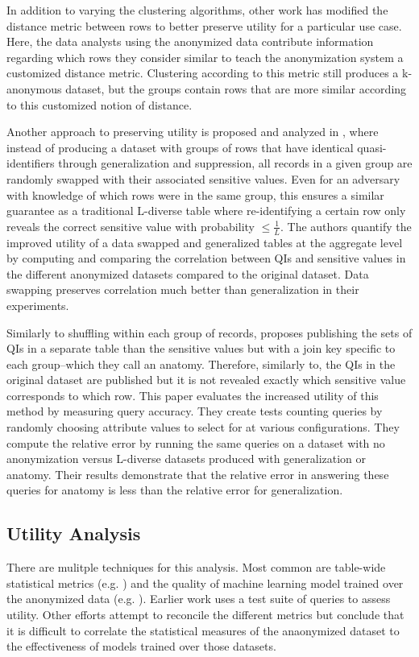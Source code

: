 In addition to varying the clustering algorithms, other work has modified the distance metric between rows to better preserve utility for a particular use case\cite{jiaPad}. Here, the data analysts using the anonymized data contribute information regarding which rows they consider similar to teach the anonymization system a customized distance metric. Clustering according to this metric still produces a k-anonymous dataset, but the groups contain rows that are more similar according to this customized notion of distance.

Another approach to preserving utility is proposed and analyzed in \cite{soriaSwapping}, where instead of producing a dataset with groups of rows that have identical quasi-identifiers through generalization and suppression, all records in a given group are randomly swapped with their associated sensitive values. Even for an adversary with knowledge of which rows were in the same group, this ensures a similar guarantee as a traditional L-diverse table where re-identifying a certain row only reveals the correct sensitive value with probability $\leq\frac{1}{L}$. The authors quantify the improved utility of a data swapped and generalized tables at the aggregate level by computing and comparing the correlation between QIs and sensitive values in the different anonymized datasets compared to the original dataset. Data swapping preserves correlation much better than generalization in their experiments.

Similarly to shuffling within each group of records, \cite{xiaoAnatomy} proposes publishing the sets of QIs in a separate table than the sensitive values but with a join key specific to each group--which they call an anatomy. Therefore, similarly to\cite{soriaSwapping}, the QIs in the original dataset are published but it is not revealed exactly which sensitive value corresponds to which row. This paper evaluates the increased utility of this method by measuring query accuracy. They create tests counting queries by randomly choosing attribute values to select for at various configurations. They compute the relative error by running the same queries on a dataset with no anonymization versus L-diverse datasets produced with generalization or anatomy. Their results demonstrate that the relative error in answering these queries for anatomy is less than the relative error for generalization.

\subsection{Utility Analysis}
There are mulitple techniques for this analysis. Most common are table-wide statistical metrics (e.g. \cite{soriaSwapping}) and the quality of machine learning model trained over the anonymized data (e.g. \cite{sangogboyePad}). Earlier work\cite{xiaoAnatomy} uses a test suite of queries to assess utility. Other efforts attempt to reconcile the different metrics but conclude that it is difficult to correlate the statistical measures of the anaonymized dataset to the effectiveness of models trained over those datasets\cite{vsarvcevicEffectiveness}.

